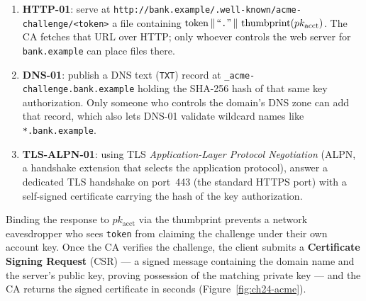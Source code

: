 \begin{enumerate}
\item \textbf{HTTP-01}: serve at \texttt{http://\allowbreak bank.example/\allowbreak.well-known/\allowbreak acme-challenge/\allowbreak<token>} a file containing $\text{token} \,\|\, \text{``\texttt{.}''} \,\|\, \operatorname{thumbprint}(pk_{\mathrm{acct}})$. The CA fetches that URL over HTTP; only whoever controls the web server for \texttt{bank.example} can place files there.
\item \textbf{DNS-01}: publish a DNS text (\texttt{TXT}) record at \texttt{\_acme-challenge.\allowbreak bank.example} holding the SHA-256 hash of that same key authorization. Only someone who controls the domain's DNS zone can add that record, which also lets DNS-01 validate wildcard names like \texttt{*.bank.example}.
\item \textbf{TLS-ALPN-01}: using TLS \emph{Application-Layer Protocol Negotiation} (ALPN, a handshake extension that selects the application protocol), answer a dedicated TLS handshake on port~443 (the standard HTTPS port) with a self-signed certificate carrying the hash of the key authorization.
\end{enumerate}

Binding the response to $pk_{\mathrm{acct}}$ via the thumbprint prevents a network eavesdropper who sees \texttt{token} from claiming the challenge under their own account key. Once the CA verifies the challenge, the client submits a \textbf{Certificate Signing Request} (CSR) --- a signed message containing the domain name and the server's public key, proving possession of the matching private key --- and the CA returns the signed certificate in seconds (Figure~\ref{fig:ch24-acme}).

